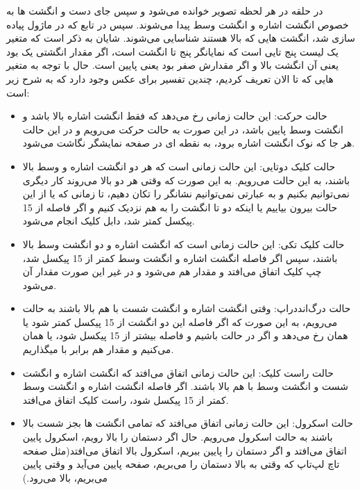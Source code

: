 \documentclass{article}
\begin{document}
در حلقه در هر لحظه تصویر خوانده می‌شود و سپس جای دست و انگشت ها به خصوص انگشت اشاره و انگشت وسط پیدا می‌شوند. سپس در تابع  که در ماژول  پیاده سازی شد، انگشت هایی که بالا هستند شناسایی می‌شوند. شایان به ذکر است که متغیر  یک لیست پنج تایی است که نمایانگر پنج تا انگشت است، اگر مقدار انگشتی یک بود یعنی آن انگشت بالا و اگر مقدارش صفر بود یعنی پایین است. حال با توجه به متغیر هایی که تا الان تعریف کردیم، چندین تفسیر برای عکس وجود دارد که به شرح زیر است:

\begin{itemize}
	\item حالت حرکت:
	این حالت زمانی رخ می‌دهد که فقط انگشت اشاره بالا باشد و انگشت وسط پایین باشد، در این صورت به حالت حرکت می‌رویم و در این حالت هر جا که نوک انگشت اشاره برود، به نقطه ای در صفحه نمایشگر نگاشت می‌شود.
	
	\item حالت کلیک دوتایی:
	این حالت زمانی است که هر دو انگشت اشاره و وسط بالا باشند، به این حالت می‌رویم. به این صورت که وقتی هر دو بالا می‌روند کار دیگری نمی‌توانیم بکنیم و به عبارتی نمی‌توانیم نشانگر را تکان دهیم، تا زمانی که یا از این حالت بیرون بیاییم یا اینکه دو تا انگشت را به هم نزدیک کنیم و اگر فاصله از 15 پیکسل کمتر شد، دابل کلیک انجام می‌شود.
	
	\item حالت کلیک تکی:
	این حالت زمانی است که انگشت اشاره و دو انگشت وسط بالا باشند، سپس اگر فاصله انگشت اشاره و انگشت وسط کمتر از 15 پیکسل شد، چپ کلیک اتفاق می‌افتد و مقدار  هم  می‌شود و در غیر این صورت مقدار آن  می‌شود.	
	
	
	\item حالت درگ‌اند‌دراپ:
	وقتی انگشت اشاره و انگشت شست با هم بالا باشند به حالت  می‌رویم، به این صورت که اگر فاصله این دو انگشت از 15 پیکسل کمتر شود  یا همان  رخ می‌دهد و اگر در حالت  باشیم و فاصله بیشتر از 15 پیکسل شود،  یا همان  می‌کنیم و مقدار  هم برابر با  میگذاریم.
	
	\item حالت راست کلیک:
	این حالت زمانی اتفاق می‌افتد که انگشت اشاره و انگشت شست و انگشت وسط با هم بالا باشند. اگر فاصله انگشت اشاره و انگشت وسط کمتر از 15 پیکسل شود، راست کلیک اتفاق می‌افتد.
	
	\item حالت اسکرول:
	این حالت زمانی اتفاق می‌افتد که تمامی انگشت ها بجز شست بالا باشند به حالت اسکرول می‌رویم. حال اگر دستمان را بالا رویم، اسکرول پایین اتفاق می‌افتد و اگر دستمان را پایین ببریم، اسکرول بالا اتفاق می‌افتد(مثل صفحه تاچ لپ‌تاپ که وقتی به بالا دستمان را می‌بریم، صفحه پایین می‌آید و وقتی پایین می‌بریم، بالا می‌رود.)
	
	
\end{itemize}
\end{document}
